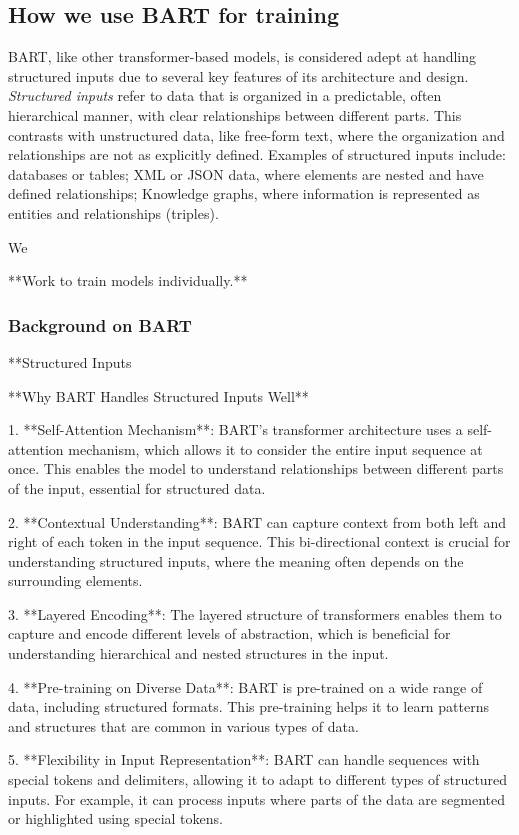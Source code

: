 \documentclass[12pt]{article}
\begin{document}
\subsection{How we use BART for training}
BART, like other transformer-based models, is considered adept at handling
structured inputs due to several key features of its architecture and design.
\emph{Structured inputs} refer to data that is organized in a predictable,
often hierarchical manner, with clear relationships between different parts.
This contrasts with unstructured data, like free-form text, where the
organization and relationships are not as explicitly defined. Examples of
structured inputs include: databases or tables; XML or JSON data, where
elements are nested and have defined relationships; Knowledge graphs, where
information is represented as entities and relationships (triples).

We 


**Work to train models individually.**
\subsubsection{Background on BART}

**Structured Inputs



**Why BART Handles Structured Inputs Well**

1. **Self-Attention Mechanism**: BART's transformer architecture uses a self-attention mechanism, which allows it to consider the entire input sequence at once. This enables the model to understand relationships between different parts of the input, essential for structured data.

2. **Contextual Understanding**: BART can capture context from both left and right of each token in the input sequence. This bi-directional context is crucial for understanding structured inputs, where the meaning often depends on the surrounding elements.

3. **Layered Encoding**: The layered structure of transformers enables them to capture and encode different levels of abstraction, which is beneficial for understanding hierarchical and nested structures in the input.

4. **Pre-training on Diverse Data**: BART is pre-trained on a wide range of data, including structured formats. This pre-training helps it to learn patterns and structures that are common in various types of data.

5. **Flexibility in Input Representation**: BART can handle sequences with special tokens and delimiters, allowing it to adapt to different types of structured inputs. For example, it can process inputs where parts of the data are segmented or highlighted using special tokens.
\end{document}
